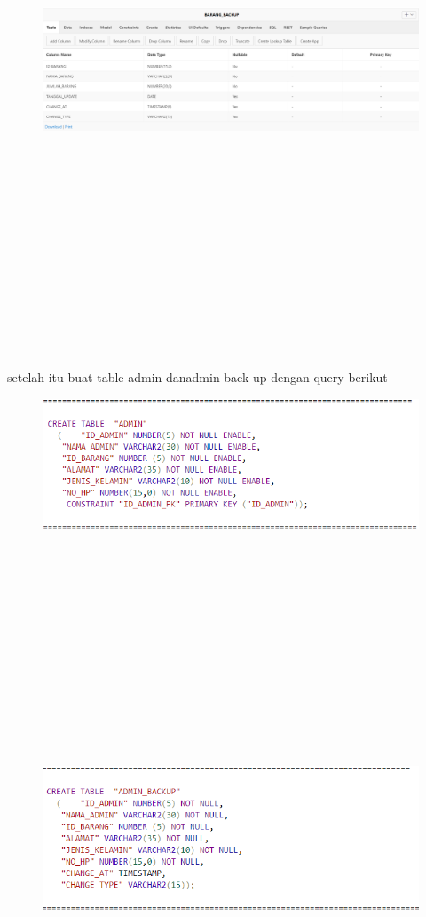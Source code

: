 \documentclass{article}
\begin{document}
\\
\\
\\
\begin{figure}[h]
\includegraphics[scale=0.3]{img/10.PNG}
\end{figure}
\\
\\
\\
\\
\\
\\
\\
\\
\\
\\
\\
\\
\par setelah itu buat table admin danadmin back up dengan query berikut
\begin{figure}[h]
\includegraphics[scale=0.3]{img/11.PNG}
\end{figure}
\\
\\
\\
\\
\\
\\
\\
\\
\\
\\
\\
\\
\begin{figure}[h]
\includegraphics[scale=0.3]{img/12.PNG}
\end{figure}
\end{document}

